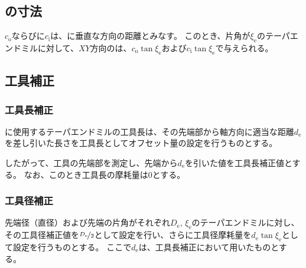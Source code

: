 \subsection{\EndFaceCChamfer の寸法}
\EndFaceOutCChamferLength$c_\mathrm o$ならびに\EndFaceInCChamferLength$c_\mathrm i$は、\EndFace に垂直な方向の距離とみなす。
このとき、片角が$\xi_\mathrm e$のテーパエンドミルに対して、$XY$方向の\EndFaceCChamferLength は、$c_\mathrm o\tan\xi_\mathrm e$および$c_\mathrm i\tan\xi_\mathrm e$で与えられる。


\subsection{工具補正}

\subsubsection{工具長補正}
\EndFaceCChamferMilling に使用するテーパエンドミルの工具長は、その先端部から軸方向に適当な距離$d_\mathrm e$を差し引いた長さを工具長としてオフセット量の設定を行うものとする。

したがって、工具の先端部を測定し、先端から$d_\mathrm e$を引いた値を工具長補正値とする。
なお、このとき工具長の摩耗量は0とする。

\subsubsection{工具径補正}
先端径（直径）および先端の片角がそれぞれ$D_\mathrm e$, $\xi_\mathrm e$のテーパエンドミルに対し、その工具径補正値を$\nicefrac{D_\mathrm e}2$として設定を行い、さらに工具径摩耗量を$d_\mathrm e\tan\xi_\mathrm e$として設定を行うものとする。
ここで$d_\mathrm e$は、工具長補正において用いたものとする。


